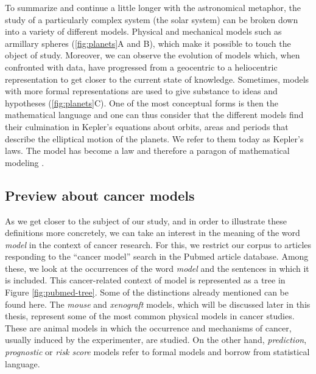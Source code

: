 \documentclass[a4paper,12pt,twoside,onecolumn,openright,final,oldfontcommands]{memoir}
\begin{document}
To summarize and continue a little longer with the astronomical
metaphor, the study of a particularly complex system (the solar system)
can be broken down into a variety of different models. Physical and
mechanical models such as armillary spheres (\ref{fig:planets}A and B),
which make it possible to touch the object of study. Moreover, we can
observe the evolution of models which, when confronted with data, have
progressed from a geocentric to a heliocentric representation to get
closer to the current state of knowledge. Sometimes, models with more
formal representations are used to give substance to ideas and
hypotheses (\ref{fig:planets}C). One of the most conceptual forms is
then the mathematical language and one can thus consider that the
different models find their culmination in Kepler's equations about
orbits, areas and periods that describe the elliptical motion of the
planets. We refer to them today as Kepler's laws. The model has become a
law and therefore a paragon of mathematical modeling
\citep{wan2018mathematical}.

\subsection{Preview about cancer
models}\label{preview-about-cancer-models}

As we get closer to the subject of our study, and in order to illustrate
these definitions more concretely, we can take an interest in the
meaning of the word \emph{model} in the context of cancer research. For
this, we restrict our corpus to articles responding to the ``cancer
model'' search in the Pubmed article database. Among these, we look at
the occurrences of the word \emph{model} and the sentences in which it
is included. This cancer-related context of model is represented as a
tree in Figure \ref{fig:pubmed-tree}. Some of the distinctions already
mentioned can be found here. The \emph{mouse} and \emph{xenograft}
models, which will be discussed later in this thesis, represent some of
the most common physical models in cancer studies. These are animal
models in which the occurrence and mechanisms of cancer, usually induced
by the experimenter, are studied. On the other hand, \emph{prediction},
\emph{prognostic} or \emph{risk score} models refer to formal models and
borrow from statistical language.
\end{document}
